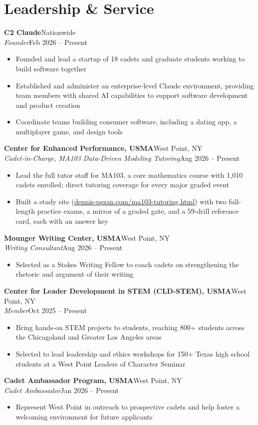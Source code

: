 \documentclass[10pt,letterpaper]{article}
\let\oldsection\section
\renewcommand{\section}{\needspace{7\baselineskip}\oldsection}
\newcommand{\entry}[4]{%
  \needspace{3\baselineskip}%
  \textbf{#1}\hfill #2\\
  \textit{#3}\hfill #4\par}
\begin{document}
\section{Leadership \& Service}
\entry{C2 Claude}{Nationwide}{Founder}{Feb 2026 -- Present}
\begin{itemize}
  \item Founded and lead a startup of 18 cadets and graduate students working to build software together
  \item Established and administer an enterprise-level Claude environment, providing team members with shared AI capabilities to support software development and product creation
  \item Coordinate teams building consumer software, including a dating app, a multiplayer game, and design tools
\end{itemize}
\entry{Center for Enhanced Performance, USMA}{West Point, NY}{Cadet-in-Charge, MA103 Data-Driven Modeling Tutoring}{Aug 2026 -- Present}
\begin{itemize}
  \item Lead the full tutor staff for MA103, a core mathematics course with 1,010 cadets enrolled; direct tutoring coverage for every major graded event
  \item Built a study site (\href{https://dennis-pezan.com/ma103-tutoring.html}{dennis-pezan.com/ma103-tutoring.html}) with two full-length practice exams, a mirror of a graded gate, and a 59-drill reference card, each with an answer key
\end{itemize}
\entry{Mounger Writing Center, USMA}{West Point, NY}{Writing Consultant}{Aug 2026 -- Present}
\begin{itemize}
  \item Selected as a Stokes Writing Fellow to coach cadets on strengthening the rhetoric and argument of their writing
\end{itemize}
\entry{Center for Leader Development in STEM (CLD-STEM), USMA}{West Point, NY}{Member}{Oct 2025 -- Present}
\begin{itemize}
  \item Bring hands-on STEM projects to students, reaching 800+ students across the Chicagoland and Greater Los Angeles areas
  \item Selected to lead leadership and ethics workshops for 150+ Texas high school students at a West Point Leaders of Character Seminar
\end{itemize}
\entry{Cadet Ambassador Program, USMA}{West Point, NY}{Cadet Ambassador}{Jan 2026 -- Present}
\begin{itemize}
  \item Represent West Point in outreach to prospective cadets and help foster a welcoming environment for future applicants
\end{itemize}
\end{document}
